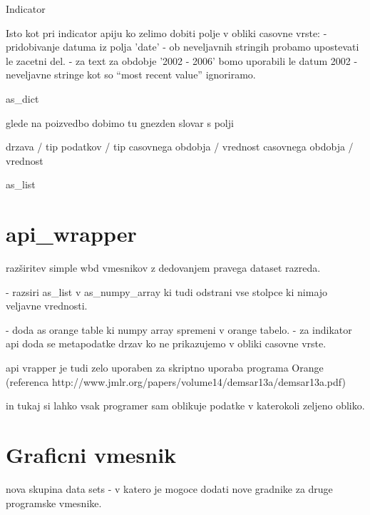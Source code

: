 Indicator




Isto kot pri indicator apiju
ko zelimo dobiti polje v obliki casovne vrste:
 - pridobivanje datuma iz polja 'date'
   - ob neveljavnih stringih probamo upostevati le zacetni del.
     - za text za  obdobje  '2002 - 2006' bomo uporabili le datum 2002 
   - neveljavne stringe kot so ``most recent value'' ignoriramo.




as\_dict 

glede na poizvedbo dobimo tu gnezden slovar s polji

drzava / tip podatkov / tip casovnega obdobja / vrednost casovnega obdobja / vrednost

as\_list

% 
% 



\section{api\_wrapper}



razširitev simple wbd vmesnikov z dedovanjem pravega dataset razreda.


- razsiri as\_list v as\_numpy\_array ki tudi odstrani vse stolpce ki nimajo 
  veljavne vrednosti.

- doda as orange table ki numpy array spremeni v orange tabelo.
  - za indikator api doda se metapodatke drzav ko ne prikazujemo v obliki casovne vrste.


api vrapper je tudi zelo uporaben za skriptno uporaba programa Orange 
(referenca http://www.jmlr.org/papers/volume14/demsar13a/demsar13a.pdf)

in tukaj si lahko vsak programer sam oblikuje podatke v katerokoli zeljeno obliko.






\section{Graficni vmesnik}


 
nova skupina data sets 
 - v katero je mogoce dodati nove gradnike za druge programske vmesnike.

